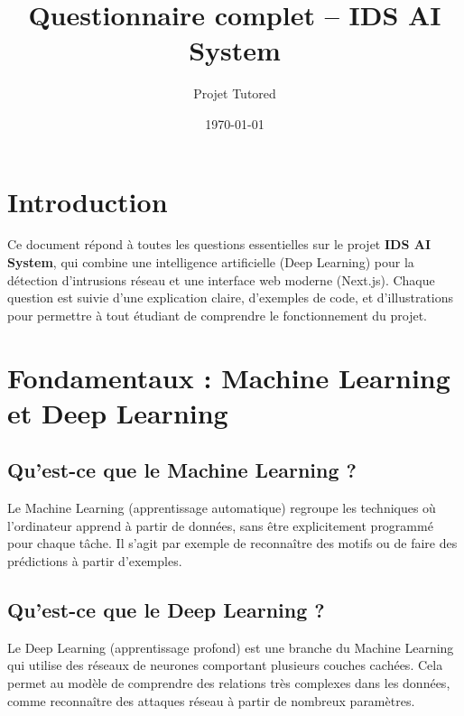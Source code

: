\documentclass[a4paper,12pt]{article}
\title{Questionnaire complet – IDS AI System}
\author{Projet Tutored}
\date{\today}
\begin{document}
\maketitle

\tableofcontents

\newpage

\section{Introduction}

Ce document répond à toutes les questions essentielles sur le projet \textbf{IDS AI System}, qui combine une intelligence artificielle (Deep Learning) pour la détection d’intrusions réseau et une interface web moderne (Next.js).  
Chaque question est suivie d’une explication claire, d’exemples de code, et d'illustrations pour permettre à tout étudiant de comprendre le fonctionnement du projet.

\section{Fondamentaux : Machine Learning et Deep Learning}

\subsection{Qu'est-ce que le Machine Learning ?}
Le Machine Learning (apprentissage automatique) regroupe les techniques où l’ordinateur apprend à partir de données, sans être explicitement programmé pour chaque tâche. Il s'agit par exemple de reconnaître des motifs ou de faire des prédictions à partir d'exemples.

\subsection{Qu'est-ce que le Deep Learning ?}
Le Deep Learning (apprentissage profond) est une branche du Machine Learning qui utilise des réseaux de neurones comportant plusieurs couches cachées. Cela permet au modèle de comprendre des relations très complexes dans les données, comme reconnaître des attaques réseau à partir de nombreux paramètres.
\end{document}
